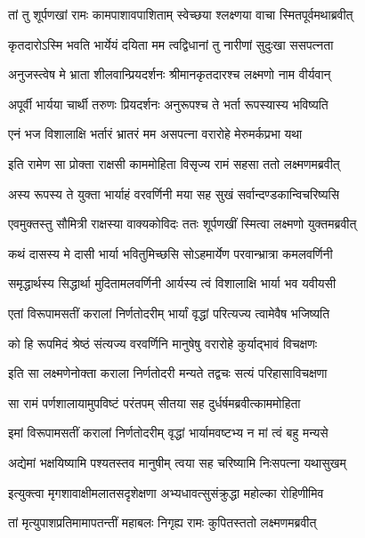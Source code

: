 \twolineshloka
{तां तु शूर्पणखां रामः कामपाशावपाशिताम्}
{स्वेच्छया श्लक्ष्णया वाचा स्मितपूर्वमथाब्रवीत्} %

\twolineshloka
{कृतदारोऽस्मि भवति भार्येयं दयिता मम}
{त्वद्विधानां तु नारीणां सुदुःखा ससपत्नता} %

\twolineshloka
{अनुजस्त्वेष मे भ्राता शीलवान्प्रियदर्शनः}
{श्रीमानकृतदारश्च लक्ष्मणो नाम वीर्यवान्} %

\twolineshloka
{अपूर्वी भार्यया चार्थी तरुणः प्रियदर्शनः}
{अनुरूपश्च ते भर्ता रूपस्यास्य भविष्यति} %

\twolineshloka
{एनं भज विशालाक्षि भर्तारं भ्रातरं मम}
{असपत्ना वरारोहे मेरुमर्कप्रभा यथा} %

\twolineshloka
{इति रामेण सा प्रोक्ता राक्षसी काममोहिता}
{विसृज्य रामं सहसा ततो लक्ष्मणमब्रवीत्} %

\twolineshloka
{अस्य रूपस्य ते युक्ता भार्याहं वरवर्णिनी}
{मया सह सुखं सर्वान्दण्डकान्विचरिष्यसि} %

\twolineshloka
{एवमुक्तस्तु सौमित्री राक्षस्या वाक्यकोविदः}
{ततः शूर्पणखीं स्मित्वा लक्ष्मणो युक्तमब्रवीत्} %

\twolineshloka
{कथं दासस्य मे दासी भार्या भवितुमिच्छसि}
{सोऽहमार्येण परवान्भ्रात्रा कमलवर्णिनी} %

\twolineshloka
{समृद्धार्थस्य सिद्धार्था मुदितामलवर्णिनी}
{आर्यस्य त्वं विशालाक्षि भार्या भव यवीयसी} %

\twolineshloka
{एतां विरूपामसतीं करालां निर्णतोदरीम्}
{भार्यां वृद्धां परित्यज्य त्वामेवैष भजिष्यति} %

\twolineshloka
{को हि रूपमिदं श्रेष्ठं संत्यज्य वरवर्णिनि}
{मानुषेषु वरारोहे कुर्याद्भावं विचक्षणः} %

\twolineshloka
{इति सा लक्ष्मणेनोक्ता कराला निर्णतोदरी}
{मन्यते तद्वचः सत्यं परिहासाविचक्षणा} %

\twolineshloka
{सा रामं पर्णशालायामुपविष्टं परंतपम्}
{सीतया सह दुर्धर्षमब्रवीत्काममोहिता} %

\twolineshloka
{इमां विरूपामसतीं करालां निर्णतोदरीम्}
{वृद्धां भार्यामवष्टभ्य न मां त्वं बहु मन्यसे} %

\twolineshloka
{अद्येमां भक्षयिष्यामि पश्यतस्तव मानुषीम्}
{त्वया सह चरिष्यामि निःसपत्ना यथासुखम्} %

\twolineshloka
{इत्युक्त्वा मृगशावाक्षीमलातसदृशेक्षणा}
{अभ्यधावत्सुसंक्रुद्धा महोल्का रोहिणीमिव} %

\twolineshloka
{तां मृत्युपाशप्रतिमामापतन्तीं महाबलः}
{निगृह्य रामः कुपितस्ततो लक्ष्मणमब्रवीत्} %

